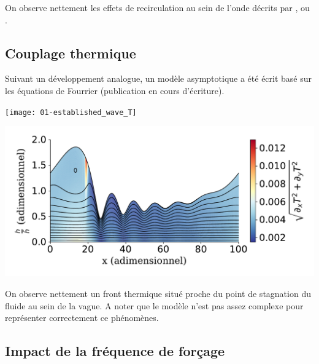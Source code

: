 \documentclass[a0,portrait]{a0poster}
\begin{document}
\begin{multicols}{2}
    On observe nettement les effets de recirculation au sein de l'onde décrits par \textcite{Brauner1989}, \textcite{Yoshimura1996} ou \textcite{Miyara1999}.

    \subsection*{Couplage thermique}
    Suivant un développement analogue, un modèle asymptotique a été écrit basé sur les équations de Fourrier (publication en cours d'écriture).

    \begin{multicols}{2}
        \begin{center}
            \texttt{[image: 01-established\_wave\_T]}
            \label{fig:thermal}
        \end{center}
        \columnbreak
        \begin{center}
            \includegraphics[width=0.98\columnwidth]{01-established_wave_Tmag_streamlines}
            \label{fig:streamlines_thermal}
        \end{center}
    \end{multicols}

    On observe nettement un front thermique situé proche du point de stagnation du fluide au sein de la vague. A noter que le modèle n'est pas assez complexe pour représenter correctement ce phénomènes.

    \subsection*{Impact de la fréquence de forçage}

    \begin{multicols}{2}

\end{multicols}
\end{multicols}
\end{document}
